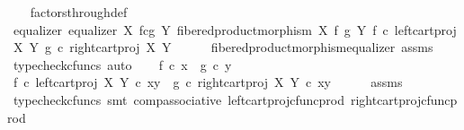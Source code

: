 \begin{isabellebody}
%
\isadelimproof
\ \ %
\endisadelimproof
%
\isatagproof
{}\isamarkupfalse%
\ factors{\isacharunderscore}{\kern0pt}through{\isacharunderscore}{\kern0pt}def\isanewline
{}\isamarkupfalse%
\ {\isacharminus}{\kern0pt}\isanewline
\ \ \isamarkupfalse%
\ equalizer{\isacharcolon}{\kern0pt}\ {\isachardoublequoteopen}equalizer\ {\isacharparenleft}{\kern0pt}X\ \isactrlbsub f\isactrlesub {\isasymtimes}\isactrlsub c\isactrlbsub g\isactrlesub \ Y{\isacharparenright}{\kern0pt}\ {\isacharparenleft}{\kern0pt}fibered{\isacharunderscore}{\kern0pt}product{\isacharunderscore}{\kern0pt}morphism\ X\ f\ g\ Y{\isacharparenright}{\kern0pt}\ {\isacharparenleft}{\kern0pt}f\ {\isasymcirc}\isactrlsub c\ left{\isacharunderscore}{\kern0pt}cart{\isacharunderscore}{\kern0pt}proj\ X\ Y{\isacharparenright}{\kern0pt}\ {\isacharparenleft}{\kern0pt}g\ {\isasymcirc}\isactrlsub c\ right{\isacharunderscore}{\kern0pt}cart{\isacharunderscore}{\kern0pt}proj\ X\ Y{\isacharparenright}{\kern0pt}{\isachardoublequoteclose}\isanewline
\ \ \ \ \isamarkupfalse%
\ fibered{\isacharunderscore}{\kern0pt}product{\isacharunderscore}{\kern0pt}morphism{\isacharunderscore}{\kern0pt}equalizer\ assms\ \isamarkupfalse%
\ {\isacharparenleft}{\kern0pt}typecheck{\isacharunderscore}{\kern0pt}cfuncs{\isacharcomma}{\kern0pt}\ auto{\isacharparenright}{\kern0pt}\isanewline
\isanewline
\ \ \isamarkupfalse%
\ {\isachardoublequoteopen}f\ {\isasymcirc}\isactrlsub c\ x\ {\isacharequal}{\kern0pt}\ g\ {\isasymcirc}\isactrlsub c\ y{\isachardoublequoteclose}\isanewline
\ \ \isamarkupfalse%
\ \isamarkupfalse%
\ {\isachardoublequoteopen}{\isacharparenleft}{\kern0pt}f\ {\isasymcirc}\isactrlsub c\ left{\isacharunderscore}{\kern0pt}cart{\isacharunderscore}{\kern0pt}proj\ X\ Y{\isacharparenright}{\kern0pt}\ {\isasymcirc}\isactrlsub c\ {\isasymlangle}x{\isacharcomma}{\kern0pt}y{\isasymrangle}\ {\isacharequal}{\kern0pt}\ {\isacharparenleft}{\kern0pt}g\ {\isasymcirc}\isactrlsub c\ right{\isacharunderscore}{\kern0pt}cart{\isacharunderscore}{\kern0pt}proj\ X\ Y{\isacharparenright}{\kern0pt}\ {\isasymcirc}\isactrlsub c\ {\isasymlangle}x{\isacharcomma}{\kern0pt}y{\isasymrangle}{\isachardoublequoteclose}\isanewline
\ \ \ \ \isamarkupfalse%
\ assms\ \isamarkupfalse%
\ {\isacharparenleft}{\kern0pt}typecheck{\isacharunderscore}{\kern0pt}cfuncs{\isacharcomma}{\kern0pt}\ smt\ comp{\isacharunderscore}{\kern0pt}associative{}\ left{\isacharunderscore}{\kern0pt}cart{\isacharunderscore}{\kern0pt}proj{\isacharunderscore}{\kern0pt}cfunc{\isacharunderscore}{\kern0pt}prod\ right{\isacharunderscore}{\kern0pt}cart{\isacharunderscore}{\kern0pt}proj{\isacharunderscore}{\kern0pt}cfunc{\isacharunderscore}{\kern0pt}prod{\isacharparenright}{\kern0pt}\isanewline

\end{isabellebody}
